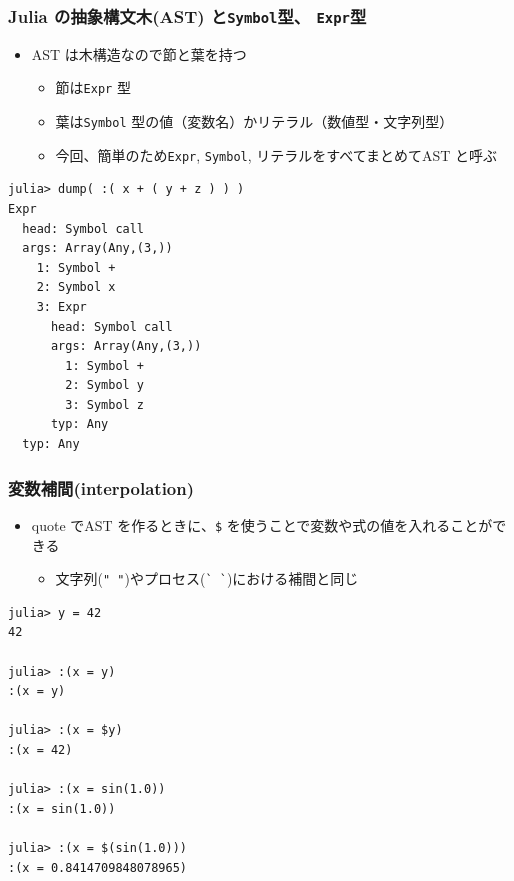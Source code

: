 \begin{frame}[containsverbatim]
\frametitle{Julia の抽象構文木(AST) と\texttt{Symbol}型、 \texttt{Expr}型}
\begin{itemize}
  \item AST は木構造なので節と葉を持つ
    \begin{itemize}
      \item 節は\verb|Expr| 型
      \item 葉は\verb|Symbol| 型の値（変数名）かリテラル（数値型・文字列型）
      \item 今回、簡単のため\verb|Expr|, \verb|Symbol|, リテラルをすべてまとめてAST と呼ぶ
    \end{itemize}
\end{itemize}
\begin{lstlisting}
julia> dump( :( x + ( y + z ) ) )
Expr
  head: Symbol call
  args: Array(Any,(3,))
    1: Symbol +
    2: Symbol x
    3: Expr
      head: Symbol call
      args: Array(Any,(3,))
        1: Symbol +
        2: Symbol y
        3: Symbol z
      typ: Any
  typ: Any
\end{lstlisting}
\end{frame}

\begin{frame}[containsverbatim]
\frametitle{変数補間(interpolation)}
\begin{itemize}
  \item quote でAST を作るときに、\verb|$| を使うことで変数や式の値を入れることができる
    \begin{itemize}
      \item 文字列(\verb|" "|)やプロセス(\verb|` `|)における補間と同じ
    \end{itemize}
\end{itemize}
\begin{lstlisting}
julia> y = 42
42

julia> :(x = y)
:(x = y)

julia> :(x = $y)
:(x = 42)

julia> :(x = sin(1.0))
:(x = sin(1.0))

julia> :(x = $(sin(1.0)))
:(x = 0.8414709848078965)
\end{lstlisting}
\end{frame}

